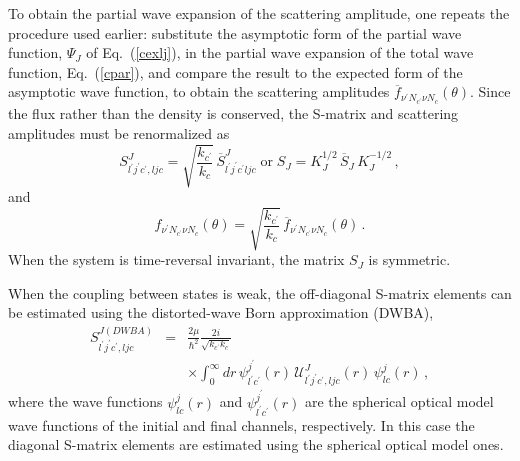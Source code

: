 \documentclass[twocolumn,amsmath,amssymb,10pt,groupedaddress,a4paper]{revtex4}
\begin{document}
To obtain the partial wave expansion of the scattering amplitude,
one repeats the procedure used earlier: substitute the asymptotic
form of the partial wave function, $\Psi_{J}$ of Eq.~(\ref{cexlj}),
in the partial wave expansion of the total wave function, Eq.~(\ref{cpar}),
and compare the result to the expected form of the asymptotic wave
function, to obtain the scattering amplitudes
$ \overline{f}_{\nu^{\prime}N_{c^{\prime}}\nu N_{c}}(\theta) $.
Since the flux rather than the density
is conserved, the S-matrix
and scattering amplitudes must be renormalized as \begin{equation}
S_{l^{\prime}j^{\prime}c^{\prime},ljc}^{J}=\sqrt{\frac{k_{c^{\prime}}}{k_{c}}}\,\overline{S}_{l^{\prime}j^{\prime}c^{\prime}ljc}^{J}\;\textrm{or}\; S_{J}=K_{J}^{1/2}\,\overline{S}_{J}\, K_{J}^{-1/2}\,,\end{equation}
 and \begin{equation}
f_{\nu^{\prime}N_{c^{\prime}}\nu N_{c}}(\theta)=\sqrt{\frac{k_{c^{\prime}}}{k_{c}}}\,\overline{f}_{\nu^{\prime}N_{c^{\prime}}\nu N_{c}}(\theta)\,.\end{equation}
When the system is time-reversal invariant, the matrix $S_{J}$ is
symmetric.

When the coupling between states is weak, the off-diagonal S-matrix
elements can be estimated using the distorted-wave Born approximation
(DWBA), \begin{eqnarray}
S_{l^{\prime}j^{\prime}c^{\prime},ljc}^{J(DWBA)} & = &
\frac{2\mu}{\hbar^2}\frac{2i}{\sqrt{k_{c^{\prime}}k_c}}
\\ & & \times  \int_0^{\infty}dr\,
  \psi_{l^{\prime}c^{\prime}}^{j^{\prime}}(r)\,{\mathcal{U}}_{l^{\prime}j^{\prime}c^{\prime},ljc}^{J}(r)\,\psi_{lc}^{j}(r)\,, \nonumber \end{eqnarray}
where the wave functions $\psi_{lc}^{j}(r)$ and
$\psi_{l^{\prime}c^{\prime}}^{j^{\prime}}(r)$ are the spherical optical model
wave functions of the initial and final channels, respectively. In this
case the diagonal S-matrix elements are estimated using the spherical
optical model ones.
\end{document}
